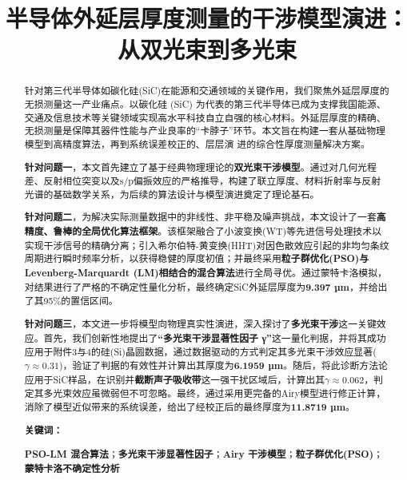\documentclass[withoutpreface,bwprint]{cumcmthesis} %
\title{半导体外延层厚度测量的干涉模型演进：从双光束到多光束}
\begin{document}
 \maketitle
\begin{abstract}
针对第三代半导体如碳化硅(SiC)在能源和交通领域的关键作用，我们聚焦外延层厚度的无损测量这一产业痛点。以碳化硅 (SiC) 为代表的第三代半导体已成为支撑我国能源、交通及信息技术等关键领域实现高水平科技自立自强的核心材料。外延层厚度的精确、无损测量是保障其器件性能与产业良率的“卡脖子”环节。本文旨在构建一套从基础物理模型到高精度算法，再到系统误差校正的、层层演
进的综合性厚度测量解决方案。

\textbf{针对问题一}，本文首先建立了基于经典物理理论的\textbf{双光束干涉模型}。通过对几何光程差、反射相位突变以及s/p偏振效应的严格推导，构建了联立厚度、材料折射率与反射光谱的基础数学关系，为后续的算法设计与模型演进奠定了理论基石。

\textbf{针对问题二}，为解决实际测量数据中的非线性、非平稳及噪声挑战，本文设计了一套\textbf{高精度、鲁棒的全局优化算法框架}。该框架融合了小波变换(WT)等先进信号处理技术以实现干涉信号的精确分离；引入希尔伯特-黄变换(HHT)对因色散效应引起的非均匀条纹周期进行瞬时频率分析，以获得稳健的厚度初值；并最终采用\textbf{粒子群优化(PSO)\cite{粒子群优化}与Levenberg-Marquardt (LM)相结合的混合算法}进行全局寻优。通过蒙特卡洛模拟，对结果进行了严格的不确定性量化分析，最终确定SiC外延层厚度为\textbf{9.397 µm}，并给出了其95\%的置信区间。

\textbf{针对问题三}，本文进一步将模型向物理真实性演进，深入探讨了\textbf{多光束干涉}这一关键效应。首先，我们创新性地提出了\textbf{“多光束干涉显著性因子 γ”}这一量化判据，并将其成功应用于附件3与4的硅(Si)晶圆数据，通过数据驱动的方式判定其多光束干涉效应显著($\gamma \approx 0.31$)，验证了判据的有效性并计算出其厚度为\textbf{6.1959 µm}。随后，将此诊断方法论应用于SiC样品，在识别并\textbf{截断声子吸收带}这一强干扰区域后，计算出其$\gamma \approx 0.062$，判定其多光束效应虽微弱但不可忽略。最终，通过采用更完备的Airy\cite{Airy}模型进行修正计算，消除了模型近似带来的系统误差，给出了经校正后的最终厚度为\textbf{11.8719 µm}。

\vspace{1em}
\noindent \textbf{关键词：} \begin{minipage}[t]{0.8\textwidth}
\textbf{PSO-LM 混合算法}；\textbf{多光束干涉显著性因子}；\textbf{Airy 干涉模型}\cite{Airy}；\textbf{粒子群优化(PSO)}\cite{粒子群优化}； 
\textbf{蒙特卡洛不确定性分析}
\end{minipage}
\end{abstract}
\end{document}
